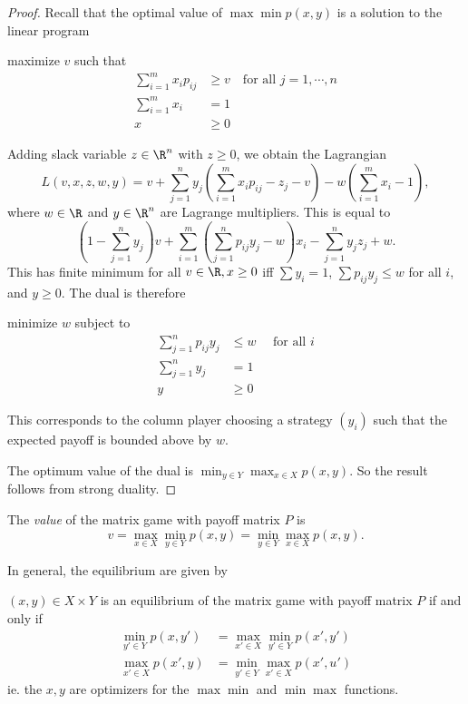 \documentclass[a4paper]{article}
\begin{document}
\begin{proof}
  Recall that the optimal value of $\max\min p(x, y)$ is a solution to the linear program
  \begin{center}
    maximize $v$ such that
    \begin{align*}
      \sum_{i = 1}^m x_i p_{ij} &\geq v\quad\text{for all }j = 1, \cdots, n\\
      \sum_{i = 1}^m x_i &= 1\\
      x &\geq 0
    \end{align*}
  \end{center}
  Adding slack variable $z\in \R^n$ with $z \geq 0$, we obtain the Lagrangian
  \[
    L(v, x, z, w, y) = v + \sum_{j = 1}^n y_j\left(\sum_{i = 1}^m x_ip_{ij} - z_j - v\right) - w\left(\sum_{i = 1}^m x_i - 1\right),
  \]
  where $w\in \R$ and $y\in \R^n$ are Lagrange multipliers. This is equal to
  \[
    \left(1 - \sum_{j = 1}^n y_j\right)v + \sum_{i = 1}^m \left(\sum_{j = 1}^n p_{ij}y_j - w\right)x_i- \sum_{j = 1}^n y_j z_j + w.
  \]
  This has finite minimum for all $v\in \R, x \geq 0$ iff $\sum y_i = 1$, $\sum p_{ij}y_j \leq w$ for all $i$, and $y \geq 0$. The dual is therefore
  \begin{center}
    minimize $w$ subject to
    \begin{align*}
      \sum_{j = 1}^n p_{ij}y_j &\leq w\quad\text{ for all }i\\
      \sum_{j = 1}^n {y_j} &= 1\\
      y &\geq 0
    \end{align*}
  \end{center}
  This corresponds to the column player choosing a strategy $(y_i)$ such that the expected payoff is bounded above by $w$.

  The optimum value of the dual is $\displaystyle\min_{y\in Y}\max_{x\in X}p(x, y)$. So the result follows from strong duality.
\end{proof}

\begin{defi}[Value]
  The \emph{value} of the matrix game with payoff matrix $P$ is
  \[
    v = \max_{x\in X}\min_{y\in Y} p(x, y) = \min_{y\in Y}\max_{x\in X} p(x, y).
  \]
\end{defi}
In general, the equilibrium are given by
\begin{thm}
  $(x, y)\in X\times Y$ is an equilibrium of the matrix game with payoff matrix $P$ if and only if
  \begin{align*}
    \min_{y'\in Y} p(x, y') &= \max_{x' \in X}\min_{y'\in Y} p(x', y')\\
    \max_{x'\in X} p(x', y) &= \min_{y' \in Y}\max_{x'\in X} p(x', u')
  \end{align*}
  ie. the $x, y$ are optimizers for the $\max\min$ and $\min\max$ functions.
\end{thm}
\end{document}
